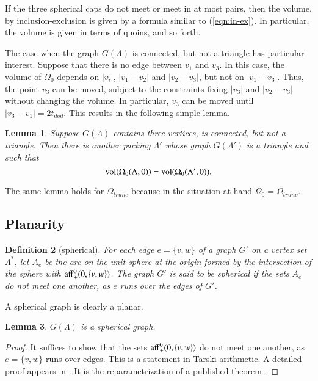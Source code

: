 \documentclass{article} %
\newtheorem{lemma}{Lemma}[subsection]
\newtheorem{definition}[lemma]{Definition}
\begin{document}
If the three spherical caps do not meet or meet in at most pairs,
then the volume, by inclusion-exclusion is given by a formula
similar to (\ref{eqn:in-ex}).  In particular, the volume
is given in terms of quoins, and so forth.

The case when the graph $G(\Lambda)$ is connected, but not a triangle
has particular interest.  Suppose that there is no edge between
$v_1$ and $v_3$. In this case, the volume of $\Omega_0$ depends on
$|v_i|$, $|v_1-v_2|$ and $|v_2-v_3|$, but not on $|v_1-v_3|$.
Thus, the point $v_3$ can be moved, subject to the constraints
fixing $|v_3|$ and $|v_2-v_3|$ without changing the volume.
In particular, $v_3$ can be moved until $|v_3-v_1|=2t_{dod}$.  This
results in the following simple lemma.  

\begin{lemma}\label{lemma:3tri}  
Suppose $G(\Lambda)$ contains three vertices,
is connected, but not a triangle.  Then there is another packing
$\Lambda'$ whose graph $G(\Lambda')$ is a triangle and such
that
$$
{\operatorname{vol}}(\Omega_0(\Lambda,0)) = {\operatorname{vol}}(\Omega_0(\Lambda',0)).
$$
\end{lemma}

The same lemma holds for $\Omega_{trunc}$ because in the situation at
hand $\Omega_0=\Omega_{trunc}$. 

\subsection{Planarity}

\begin{definition}[spherical]
For each edge $e=\{v,w\}$ of a graph $G'$ on a vertex set $\Lambda^*$, 
let $A_e$ be the
arc on the unit sphere at the origin formed by the intersection of the
sphere with ${\operatorname{aff}}^0_+(0,\{v,w\})$. The graph $G'$  is said to be \emph{spherical} if the sets $A_e$ do not meet
one another, as $e$ runs over the edges of $G'$.
\end{definition}

A spherical graph is clearly a planar.

\begin{lemma}\label{lemma:planar}  
$G(\Lambda)$ is a spherical graph.
\end{lemma}

\begin{proof} 
  It suffices to show that the sets
  ${\operatorname{aff}}^0_+(0,\{v,w\})$ do not meet one another, as $e=\{v,w\}$
  runs over edges.  This is a statement in Tarski arithmetic.
  A detailed proof appears in \cite[Lemma~3.2]{Hales:2002:Dodec}.  
  It is the reparametrization
  of a published theorem \cite[Lemma~3.10]{Hales:1997:DCG}.
\end{proof}
\end{document}
